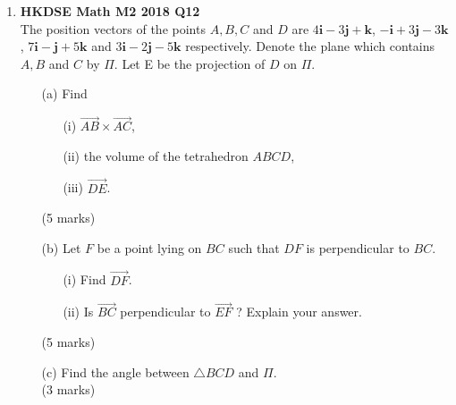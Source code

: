 \documentclass{report}
\begin{document}
\begin{enumerate}
	\item \textbf{HKDSE Math M2 2018 Q12}\\
	The position vectors of the points $A, B, C$ and $D$ are  
	$4\textbf{i} -3 \textbf{j} + \textbf {k}$, 
	$-\textbf{i} +3 \textbf{j} -3 \textbf {k}$, 
	$7\textbf{i} - \textbf{j} +5 \textbf {k}$ and 
	$3\textbf{i} -2 \textbf{j} -5 \textbf {k}$  
	respectively. Denote the plane which contains $A, B$ and $C$ by $\Pi$. Let E be the projection of  $D$ on $\Pi$.
	\begin{enumerate}
		\item [(a)]Find
		\begin{enumerate}
			\item [(i)]$\overrightarrow{AB} \times \overrightarrow{AC}$,
			\item [(ii)]the volume of the tetrahedron $ABCD$,
			\item [(iii)]$\overrightarrow{DE}$.
		\end{enumerate}
		(5 marks)
		\item [(b)]Let $F$ be a point lying on $BC$ such that $DF$ is perpendicular to $BC$.
		\begin{enumerate}
			\item [(i)]Find $\overrightarrow{DF}$. 
			\item [(ii)]Is $\overrightarrow{BC} $ perpendicular to $\overrightarrow{EF}$ ? Explain your answer.
		\end{enumerate}
		(5 marks)
		\item[(c)]Find the angle between $\triangle BCD$ and $\Pi$. \\(3 marks)
	\end{enumerate}
	
	\newpage


\end{enumerate}
\end{document}
